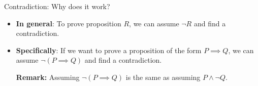 \documentclass[10pt]{beamer}
\begin{document}
\begin{frame}{Contradiction: Why does it work?}

\begin{itemize}
\item \textbf{In general}: To prove proposition $R$, we can assume $\lnot R$ and find a contradiction. \pause 
\item \textbf{Specifically}: If we want to prove a proposition of the form $P \implies Q$, we can assume  $\lnot (P \implies Q)$ and find a contradiction. \pause 

	\vspace{.5cm}
	
	\colorbox{blue!30}{\textbf{Remark:}} Assuming  $\lnot (P \implies Q)$ is the same as assuming $P \land \lnot Q$.    
\end{itemize}

 	
\end{frame}
\end{document}
